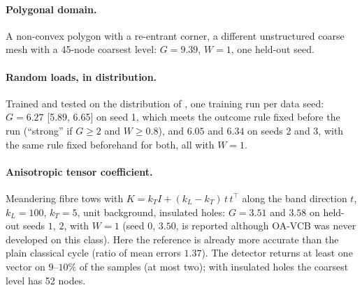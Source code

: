 \paragraph{Polygonal domain.} A non-convex polygon with a re-entrant corner, a different unstructured coarse mesh with a 45-node
coarsest level: $G = 9.39$, $W=1$, one held-out seed.
\paragraph{Random loads, in distribution.} Trained and tested on the distribution of , one training run per data
seed: $G = 6.27$ [5.89, 6.65] on seed 1, which meets the outcome rule fixed before the run (``strong'' if $G\ge2$ and $W\ge0.8$), and
$6.05$ and $6.34$ on seeds 2 and 3, with the same rule fixed beforehand for both, all with $W = 1$.
\paragraph{Anisotropic tensor coefficient.} Meandering fibre tows with $K = k_T I + (k_L - k_T)\,t\,t^\top$ along the band direction
$t$, $k_L = 100$, $k_T = 5$, unit background, insulated holes: $G = 3.51$ and $3.58$ on held-out seeds $1$, $2$, with $W=1$ (seed $0$,
$3.50$, is reported although OA-VCB was never developed on this class). Here the reference is already more accurate than the plain
classical cycle (ratio of mean errors $1.37$). The detector returns at least one vector on $9$--$10\%$ of the samples (at most two);
with insulated holes the coarsest level has 52 nodes.
